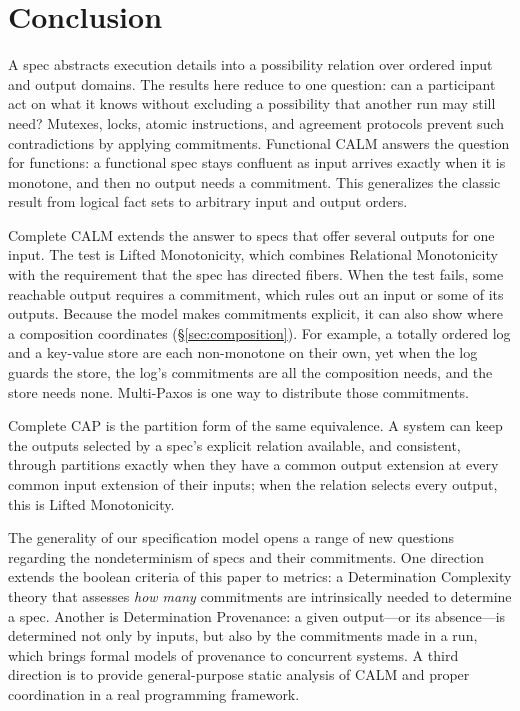 \documentclass[sigconf]{cidr-2027}
\theoremstyle{remark}
\newcommand{\commitment}{commitment\xspace}
\newcommand{\commitments}{commitments\xspace}
\newcommand{\indesc}{input extension\xspace} %
\newcommand{\outnoun}{output extension\xspace}%
\begin{document}
\section{Conclusion}
\label{sec:conclusion}

A spec abstracts execution details into a possibility relation over
ordered input and output domains.
The results here reduce to one question: can a participant act on what it knows
without excluding a possibility that another run may still need?  Mutexes,
locks, atomic instructions, and agreement protocols prevent such contradictions
by applying \commitments.
Functional CALM answers the question for functions: a functional spec
stays confluent as input arrives exactly when it is monotone, and then no
output needs a \commitment.  This generalizes the classic result from logical fact
sets to arbitrary input and output orders.

Complete CALM extends the answer to specs that offer several outputs
for one input.  The test is Lifted Monotonicity, which combines Relational
Monotonicity with the requirement that the spec has directed fibers.  When the test fails, some reachable output
requires a \commitment, which rules out an input or some of its outputs.
Because the model makes \commitments explicit, it can also show where a
composition coordinates (\S\ref{sec:composition}).  For example, a totally ordered log
and a key-value store are each non-monotone on their own, yet when the log
guards the store, the log's \commitments are all the composition needs, and
the store needs none.  Multi-Paxos is one way to distribute those
\commitments.

Complete CAP is the partition form of the same equivalence.  A system can keep
the outputs selected by a spec's explicit relation available, and
consistent, through partitions exactly when they have a common \outnoun at
every common \indesc of their inputs; when the relation selects every output,
this is Lifted Monotonicity.

The generality of our specification model opens a range of new questions
regarding the nondeterminism of specs and their \commitments. One direction
extends the boolean criteria of this paper to metrics: a Determination
Complexity theory that assesses \emph{how many} \commitments are intrinsically
needed to determine a spec. Another is Determination Provenance: a
given output---or its absence---is determined not only by inputs, but also by
the \commitments made in a run, which brings formal models of provenance to
concurrent systems. A third direction is to provide general-purpose static
analysis of CALM and proper coordination in a real programming framework.
\end{document}
